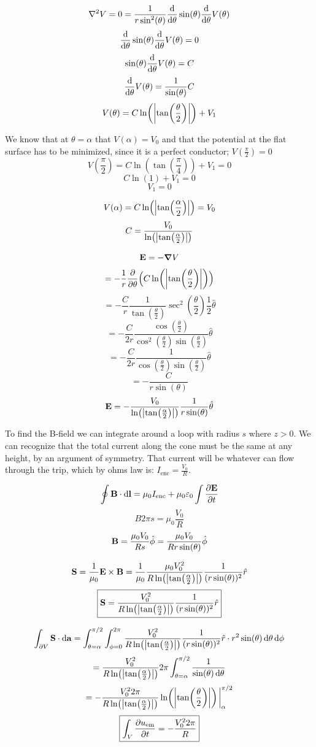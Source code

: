 \documentclass[12pt]{article}
\begin{document}
\[\laplacian{V} =0= \frac{1}{r \sin^2(\theta)}\dv{\theta}\sin(\theta)\dv{\theta}V(\theta)\]
\[\dv{\theta}\sin(\theta)\dv{\theta}V(\theta) = 0\]
\[\sin(\theta)\dv{\theta}V(\theta) = C\]
\[\dv{\theta}V(\theta) = \frac{1}{\sin(\theta)}C\]
\[V(\theta) = C\ln(\abs{\tan(\frac{\theta}{2})}) + V_1\]

We know that at $\theta = \alpha$ that $V(\alpha) = V_0$ and that the potential at the flat surface has to be minimized, since it is a perfect conductor; $V(\frac{\pi}{2}) = 0$
\[V(\frac{\pi}{2}) = C\ln(\tan(\frac{\pi}{4})) + V_1 = 0\]
\[C\ln(1) + V_1 = 0\]
\[V_1 = 0\]

\[V(\alpha) = C \ln(\abs{\tan(\frac{\alpha}{2})}) = V_0\]
\[C = \frac{V_0}{\ln(\abs{\tan(\frac{\alpha}{2})})}\]


\[\vb{E} = -\grad{V}\]
\[= -\frac{1}{r}\pdv{\theta}\Big(C \ln(\abs{\tan(\frac{\theta}{2})})\Big)\]
\[= -\frac{C}{r} \frac{1}{\tan(\frac{\theta}{2})}\sec^2(\frac{\theta}{2})\frac{1}{2}\hat{\theta}\]
\[=-\frac{C}{2r}\frac{\cos(\frac{\theta}{2})}{\cos^2(\frac{\theta}{2})\sin(\frac{\theta}{2})}\hat{\theta}\]
\[=-\frac{C}{2r}\frac{1}{\cos(\frac{\theta}{2})\sin(\frac{\theta}{2})}\hat{\theta}\]
\[= -\frac{C}{r \sin(\theta)}\]
\[\vb{E}= - \frac{V_0}{\ln(\abs{\tan(\frac{\alpha}{2})})}\frac{1}{r \sin(\theta)}\hat{\theta}\]

To find the B-field we can integrate around a loop with radius $s$ where $z>0$. We can recognize that the total current along the cone must be the same at any height, by an argument of symmetry. That current will be whatever can flow through the trip, which by ohms law is: $I_\text{enc} = \frac{V_0}{R}$.

\[\oint \vb{B} \cdot \dd{\vb{l}} = \mu_0 I_\text{enc} + \mu_0 \varepsilon_0 \int \pdv{\vb{E}}{t}\]
\[B 2\pi s = \mu_0 \frac{V_0}{R}\]
\[\vb{B} = \frac{\mu_0 V_0}{Rs}\hat{\phi} = \frac{\mu_0 V_0}{Rr \sin(\theta)}\hat{\phi}\]

\[\vb{S} = \frac{1}{\mu_0} \vb{E} \times \vb{B} = \frac{1}{\mu_0}\frac{\mu_0 V_0^2}{R \ln(\abs{\tan(\frac{\alpha}{2})})}\frac{1}{(r\sin(\theta))^2}\hat{r}\]
\[\boxed{\vb{S} =\frac{V_0^2}{R\ln(\abs{\tan(\frac{\alpha}{2})})}\frac{1}{(r\sin(\theta))^2}\hat{r}}\]

\[\int_{\partial V}\vb{S} \cdot \dd{\vb{a}} = \int_{\theta = \alpha}^{\pi/2} \int_{\phi = 0}^{2\pi} \frac{V_0^2}{R\ln(\abs{\tan(\frac{\alpha}{2})})}\frac{1}{(r\sin(\theta))^2}\hat{r} \cdot r^2 \sin(\theta)\dd{\theta} \dd{\phi}\]
\[=\frac{V_0^2}{R \ln(\abs{\tan(\frac{\alpha}{2})})}2\pi \int_{\theta = \alpha}^{\pi/2} \frac{1}{\sin(\theta)\dd{\theta}}\]
\[= -\frac{V_0^2 2\pi}{R \ln(\abs{\tan(\frac{\alpha}{2})})} \ln(\abs{\tan(\frac{\theta}{2})})\eval_\alpha^{\pi/2}\]
\[\boxed{\int_V \pdv{u_\text{em}}{t} = -\frac{V_0^2 2\pi}{R}}\]
\end{document}
